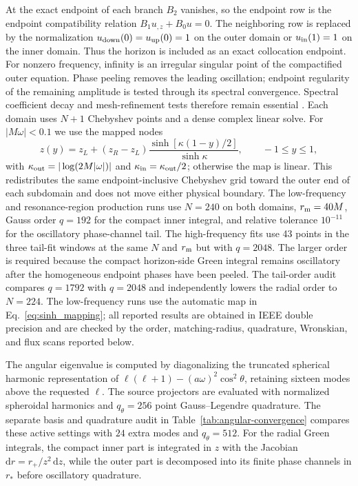 \documentclass[aps,prd,twocolumn,10pt,nofootinbib,superscriptaddress,floatfix]{revtex4-2}
\newcommand{\dd}{\mathrm{d}}
\begin{document}
At the exact endpoint of each branch $B_2$ vanishes, so the endpoint row is
the endpoint compatibility relation
$B_1u_{,z}+B_0u=0$.  The neighboring row is replaced by the normalization
$u_{\rm down}(0)=u_{\rm up}(0)=1$ on the outer domain or
$u_{\rm in}(1)=1$ on the inner domain.  Thus the horizon is included as an
exact collocation endpoint.  For nonzero frequency, infinity is an
irregular singular point of the compactified outer equation.  Phase
peeling removes the leading oscillation; endpoint regularity of the
remaining amplitude is tested through its spectral convergence.  Spectral
coefficient decay and mesh-refinement tests therefore remain essential
\cite{HeTianZhangManuscript2026}.  Each domain
uses $N+1$ Chebyshev points and a dense complex linear solve.  For
$|M\omega|<0.1$ we use the mapped nodes
\begin{equation}
z(y)=z_L+(z_R-z_L)
\frac{\sinh[\kappa(1-y)/2]}{\sinh\kappa},
\qquad -1\le y\le1,
\label{eq:sinh_mapping}
\end{equation}
with $\kappa_{\rm out}=|\log(2M|\omega|)|$ and
$\kappa_{\rm in}=\kappa_{\rm out}/2$; otherwise the map is linear.  This
redistributes the same endpoint-inclusive Chebyshev grid toward the outer end
of each subdomain and does not move either physical boundary.  The low-frequency
and resonance-region production runs use $N=240$ on both domains,
$r_{\rm m}=40M$, Gauss order $q=192$ for the compact inner integral, and
relative tolerance $10^{-11}$ for the oscillatory phase-channel tail.  The
high-frequency fits use 43 points in the three tail-fit windows at the same $N$ and
$r_{\rm m}$ but with $q=2048$.  The larger order is required because the
compact horizon-side Green integral remains oscillatory after the homogeneous
endpoint phases have been peeled.  The tail-order audit compares $q=1792$
with $q=2048$ and independently lowers the radial order to $N=224$.  The
low-frequency runs use the automatic map in Eq.~\eqref{eq:sinh_mapping}; all
reported results are obtained in IEEE double precision
and are checked by the order, matching-radius, quadrature, Wronskian, and flux
scans reported below.

The angular eigenvalue is computed by diagonalizing the truncated spherical
harmonic representation of
$\ell(\ell+1)-(a\omega)^2\cos^2\theta$, retaining sixteen modes above
the requested $\ell$.  The source projectors are evaluated with normalized
spheroidal harmonics and $q_\theta=256$ point Gauss--Legendre quadrature.  The
separate basis and quadrature audit in Table~\ref{tab:angular-convergence}
compares these active settings with $24$ extra modes and $q_\theta=512$.  For the radial Green
integrals, the compact inner part is integrated in $z$ with the Jacobian
$\dd r=r_+/z^2\,\dd z$, while the outer part is decomposed into its finite
phase channels in $r_*$ before oscillatory quadrature.
\end{document}
